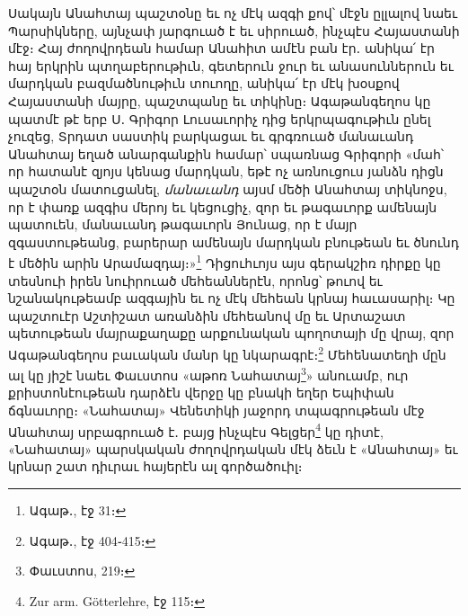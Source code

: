 \documentclass{article}
\begin{document}
{Սակայն Անահտայ պաշտօնը եւ ոչ մէկ ազգի քով՝ մէջն ըլլալով նաեւ Պարսիկները, այնչափ յարգուած է եւ սիրուած, ինչպէս Հայաստանի մէջ։ Հայ ժողովրդեան համար Անահիտ ամէն բան էր․ անիկա՛ էր հայ երկրին պտղաբերութիւն, գետերուն ջուր եւ անասուններուն եւ մարդկան բազմածնութիւն տուողը, անիկա՛ էր մէկ խօսքով Հայաստանի մայրը, պաշտպանը եւ տիկինը։ Ագաթանգեղոս կը պատմէ թէ երբ Ս․ Գրիգոր Լուսաւորիչ դից երկրպագութիւն ընել չուզեց, Տրդատ սաստիկ բարկացաւ եւ գրգռուած մանաւանդ Անահտայ եղած անարգանքին համար՝ սպառնաց Գրիգորի «մահ՝ որ հատանէ զյոյս կենաց մարդկան, եթէ ոչ առնուցուս յանձն դիցն պաշտօն մատուցանել, \emph{մանաւանդ} այսմ մեծի Անահտայ տիկնոջս, որ է փառք ազգիս մերոյ եւ կեցուցիչ, զոր եւ թագաւորք ամենայն պատուեն, մանաւանդ թագաւորն Յունաց, որ է մայր զգաստութեանց, բարերար ամենայն մարդկան բնութեան եւ ծնունդ է մեծին արին Արամազդայ։»\footnote{Ագաթ․, էջ 31։} Դիցուհւոյս այս գերակշիռ դիրքը կը տեսնուի իրեն նուիրուած մեհեաններէն, որոնց՝ թուով եւ նշանակութեամբ ազգային եւ ոչ մէկ մեհեան կրնայ հաւասարիլ։ Կը պաշտուէր Աշտիշատ առանձին մեհեանով մը եւ Արտաշատ պետութեան մայրաքաղաքը արքունական պողոտայի մը վրայ, զոր Ագաթանգեղոս բաւական մանր կը նկարագրէ։\footnote{Ագաթ․, էջ 404֊415։} Մեհենատեղի մըն ալ կը յիշէ նաեւ Փաւստոս «աթոռ Նահատայ\footnote{Փաւստոս, 219։}» անուամբ, ուր քրիստոնէութեան դարձէն վերջը կը բնակի եղեր Եպիփան ճգնաւորը։ «Նահատայ» Վենետիկի յաջորդ տպագրութեան մէջ Անահտայ սրբագրուած է․ բայց ինչպէս Գելցեր\footnote{Zur arm. Götterlehre, էջ 115։} կը դիտէ, «Նահատայ» պարսկական ժողովրդական մէկ ձեւն է «Անահտայ» եւ կրնար շատ դիւրաւ հայերէն ալ գործածուիլ։

}
\end{document}
